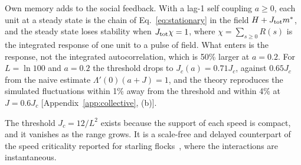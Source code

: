 Own memory adds to the social feedback. With a lag-1 self coupling $a\ge0$, each unit at a steady state is the chain of Eq.~\eqref{eq:stationary} in the field $H+J_{\rm tot}m^*$, and the steady state loses stability when $J_{\rm tot}\chi=1$, where $\chi=\sum_{s\ge0}R(s)$ is the integrated response of one unit to a pulse of field. What enters is the response, not the integrated autocorrelation, which is 50\% larger at $a=0.2$. For $L=\ln100$ and $a=0.2$ the threshold drops to $J_c(a)=0.71J_c$, against $0.65J_c$ from the naive estimate $\Lambda'(0)(a+J)=1$, and the theory reproduces the simulated fluctuations within 1\% away from the threshold and within 4\% at $J=0.6J_c$ [Appendix~\ref{app:collective}, (b)].

The threshold $J_c=12/L^2$ exists because the support of each speed is compact, and it vanishes as the range grows. It is a scale-free and delayed counterpart of the speed criticality reported for starling flocks~\cite{Bialek2014}, where the interactions are instantaneous.
